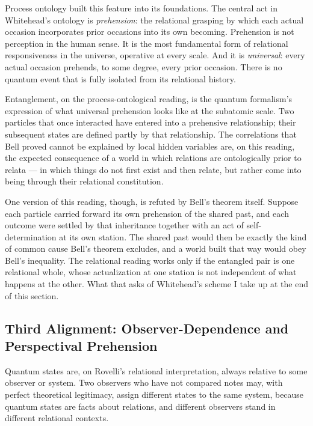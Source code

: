 Process ontology built this feature into its foundations.
The central act in Whitehead's ontology is \emph{prehension}: the relational
grasping by which each actual occasion incorporates prior occasions into its own
becoming.
Prehension is not perception in the human sense.
It is the most fundamental form of relational responsiveness in the universe,
operative at every scale.
And it is \emph{universal}: every actual occasion prehends, to some degree, every
prior occasion.
There is no quantum event that is fully isolated from its relational history.

Entanglement, on the process-ontological reading, is the quantum formalism's
expression of what universal prehension looks like at the subatomic scale.
Two particles that once interacted have entered into a prehensive relationship;
their subsequent states are defined partly by that relationship.
The correlations that Bell proved cannot be explained by local hidden variables
are, on this reading, the expected consequence of a world in which relations
are ontologically prior to relata --- in which things do not first exist and then
relate, but rather come into being through their relational constitution.

One version of this reading, though, is refuted by Bell's theorem itself.
Suppose each particle carried forward its own prehension of the shared past, and
each outcome were settled by that inheritance together with an act of
self-determination at its own station.
The shared past would then be exactly the kind of common cause Bell's theorem
excludes, and a world built that way would obey Bell's inequality.
The relational reading works only if the entangled pair is one relational whole,
whose actualization at one station is not independent of what happens at the
other.
What that asks of Whitehead's scheme I take up at the end of this section.

\subsection*{Third Alignment: Observer-Dependence and Perspectival Prehension}

Quantum states are, on Rovelli's relational interpretation, always relative to
some observer or system.
Two observers who have not compared notes may, with perfect theoretical legitimacy,
assign different states to the same system, because quantum states are facts
about relations, and different observers stand in different relational contexts.

